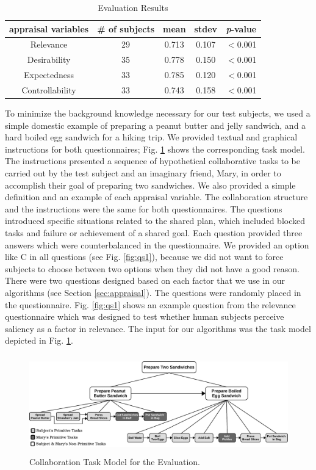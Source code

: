 \vspace*{-6mm}
\begin{table}[htbp]
\centering
\centering
\caption{Evaluation Results}
\begin{tabular}{|c|c|c|c|c|} \hline
appraisal variables & \# of subjects & mean & stdev & \textit{p}-value\\ \hline 
Relevance &  29 & 0.713 & 0.107 & $<$0.001\\ \hline
Desirability & 35 & 0.778 & 0.150 & $<$0.001\\ \hline 
Expectedness & 33 & 0.785 & 0.120 & $<$0.001\\ \hline 
Controllability & 33 & 0.743 & 0.158 & $<$0.001\\ \hline
\end{tabular}
\label{tbl:statistics}
\end{table}
\vspace*{-4mm}

To minimize the background knowledge necessary for our test subjects, we used a
simple domestic example of preparing a peanut butter and jelly sandwich, and a
hard boiled egg sandwich for a hiking trip. We provided textual and graphical
instructions for both questionnaires; Fig. \ref{fig:taskModel} shows the
corresponding task model. The instructions presented a sequence of hypothetical
collaborative tasks to be carried out by the test subject and an imaginary
friend, Mary, in order to accomplish their goal of preparing two sandwiches. We
also provided a simple definition and an example of each appraisal variable. The
collaboration structure and the instructions were the same for both
questionnaires. The questions introduced specific situations related to the
shared plan, which included blocked tasks and failure or achievement of a shared
goal. Each question provided three answers which were counterbalanced in the
questionnaire. We provided an option like C in all questions (see Fig.
\ref{fig:qs1}), because we did not want to force subjects to choose between two
options when they did not have a good reason. There were two questions designed
based on each factor that we use in our algorithms (see Section
\ref{sec:appraisal}). The questions were randomly placed in the questionnaire.
Fig. \ref{fig:qs1} shows an example question from the relevance questionnaire
which was designed to test whether human subjects perceive saliency as a factor
in relevance. The input for our algorithms was the task model depicted in Fig.
\ref{fig:taskModel}.

\begin{figure}[t]
  \centering
  \includegraphics[width=12cm,height=4.25cm]{figure/taskModel-croped.pdf}
  \caption{Collaboration Task Model for the Evaluation.}
  \label{fig:taskModel}
\end{figure}

